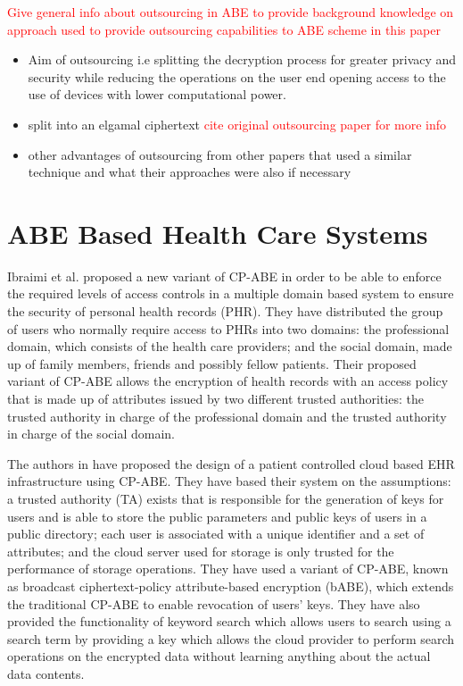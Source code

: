 \textcolor{red}{Give general info about outsourcing in ABE to provide background knowledge on approach used to provide outsourcing capabilities to ABE scheme in this paper}

\begin{itemize}
	\item Aim of outsourcing i.e splitting the decryption process for greater privacy and security while reducing the operations on the user end opening access to the use of devices with lower computational power.
	
	\item split into an elgamal ciphertext \textcolor{red}{cite original outsourcing paper for more info}
	
	\item other advantages of outsourcing from other papers that used a similar technique and what their approaches were also if necessary
	
\end{itemize}


\section{ABE Based Health Care Systems}

Ibraimi et al. proposed a new variant of CP-ABE \cite{Ibraimi2010} in order to be able to enforce the required levels of access controls in a multiple domain based system to ensure the security of personal health records (PHR). They have distributed the group of users who normally require access to PHRs into two domains: the professional domain, which consists of the health care providers; and the social domain, made up of family members, friends and possibly fellow patients. Their proposed variant of CP-ABE allows the encryption of health records with an access policy that is made up of attributes issued by two different trusted authorities: the trusted authority in charge of the professional domain and the trusted authority in charge of the social domain.

The authors in \cite{Narayan2010} have proposed the design of a patient controlled cloud based EHR infrastructure using CP-ABE. They have based their system on the assumptions: a trusted authority (TA) exists that is responsible for the generation of keys for users and is able to store the public parameters and public keys of users in a public directory; each user is associated with a unique identifier and a set of attributes; and the cloud server used for storage is only trusted for the performance of storage operations. They have used a variant of CP-ABE, known as broadcast ciphertext-policy attribute-based encryption (bABE), which extends the traditional CP-ABE to enable revocation of users' keys. They have also provided the functionality of keyword search which allows users to search using a search term by providing a key which allows the cloud provider to perform search operations on the encrypted data without learning anything about the actual data contents.

